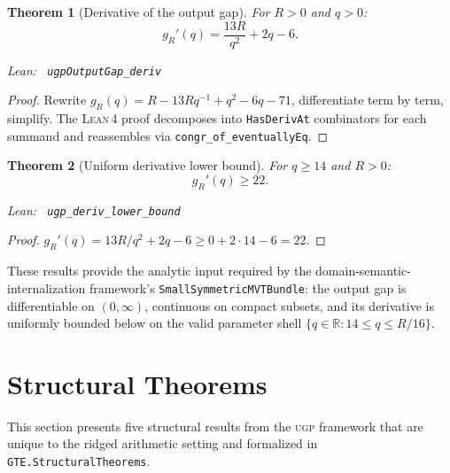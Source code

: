 \documentclass[11pt,a4paper]{article}
\newenvironment{leanref}%
  {\par\smallskip\noindent\begingroup\raggedright\textup{Lean:}~}%
  {\par\endgroup}
\newtheorem{theorem}{Theorem}[section]
\theoremstyle{definition}
\newcommand{\ugp}{\textsc{ugp}}
\newcommand{\lean}{\textsc{Lean}\,4}
\begin{document}
\begin{theorem}[Derivative of the output gap]\label{thm:deriv}
For $R > 0$ and $q > 0$:
\[
  g_R'(q) = \frac{13R}{q^2} + 2q - 6.
\]

\begin{leanref} \lstinline|ugpOutputGap_deriv|
\end{leanref}
\end{theorem}

\begin{proof}
Rewrite $g_R(q) = R - 13Rq^{-1} + q^2 - 6q - 71$,
differentiate term by term, simplify.  The \lean{} proof
decomposes into \texttt{HasDerivAt} combinators for
each summand and reassembles via \texttt{congr\_of\_eventuallyEq}.
\end{proof}

\begin{theorem}[Uniform derivative lower bound]\label{thm:deriv-bound}
For $q \ge 14$ and $R > 0$:
\[
  g_R'(q) \ge 22.
\]

\begin{leanref} \lstinline|ugp_deriv_lower_bound|
\end{leanref}
\end{theorem}

\begin{proof}
$g_R'(q) = 13R/q^2 + 2q - 6 \ge 0 + 2 \cdot 14 - 6 = 22$.
\end{proof}

\noindent
These results provide the analytic input required by the
domain-semantic-internalization framework's
\texttt{SmallSymmetricMVTBundle}: the output gap is differentiable
on $(0,\infty)$, continuous on compact subsets, and its derivative
is uniformly bounded below on the valid parameter shell
$\{q \in \mathbb{R} : 14 \le q \le R/16\}$.

\section{Structural Theorems}\label{sec:structural}

This section presents five structural results from the \ugp{} framework
that are unique to the ridged arithmetic setting and formalized in
\texttt{GTE.StructuralTheorems}.
\end{document}
